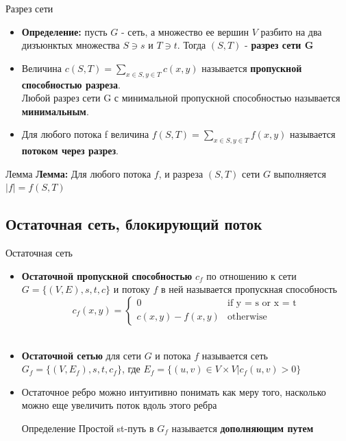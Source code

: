 \documentclass{beamer}
\begin{document}
\begin{frame}{Разрез сети}
  \begin{itemize}
    \item {
        \textbf{Определение: } пусть $G$ - сеть, а множество ее вершин $V$ разбито на два дизъюнктых множества $S \ni s$ и $T \ni t$. Тогда $(S,T)$ - \textbf{разрез сети G}
        \pause
    }
    \item {
        Величина $c(S, T) =  \sum\limits_{x \in S, y \in T}c(x, y)$ называется \textbf{пропускной способностью разреза}. \\ Любой разрез сети G с минимальной пропускной способностью называется \textbf{минимальным}.
        \pause
    }
    \item {
        Для любого потока f величина $f(S, T) =  \sum\limits_{x \in S, y \in T} f(x, y)$ называется \textbf{потоком через разрез}.
        \pause
    }
    \end{itemize}
    \begin{block}{Лемма}
        \textbf{Лемма: } Для любого потока $f$, и разреза $(S, T)$ сети $G$ выполняется $|f| = f(S, T)$
    \end{block}
\end{frame}

\subsection{Остаточная сеть, блокирующий поток}

\begin{frame}{Остаточная сеть}
    \begin{itemize}
    \item {
        \textbf{Остаточной пропускной способностью} $c_{f}$ по отношению к сети $G = \{(V, E), s, t, c\}$ и потоку $f$ в ней называется пропускная способность
        \begin{equation*}
        c_{f}(x, y) = 
         \begin{cases}
           0 &\text{if y = s or x = t}\\
           c(x, y) - f(x, y) &\text{otherwise}
         \end{cases}
        \end{equation*}
        \\
        \pause
    }
    \item {
        \textbf{Остаточной сетью} для сети $G$ и потока $f$ называется сеть $G_{f} = \{(V, E_{f}), s, t, c_{f}\}$, где $E_{f} = \{ (u, v) \in V \times V | c_{f}(u, v) > 0\}$
    }
    \item {
        Остаточное ребро можно интуитивно понимать как меру того, насколько можно еще увеличить поток вдоль этого ребра
        \pause
    }
    \begin{exampleblock}{Определение}
    Простой st-путь в $G_{f}$ называется \textbf{дополняющим путем}
    \end{exampleblock}

    \end{itemize}
\end{frame}
\end{document}
